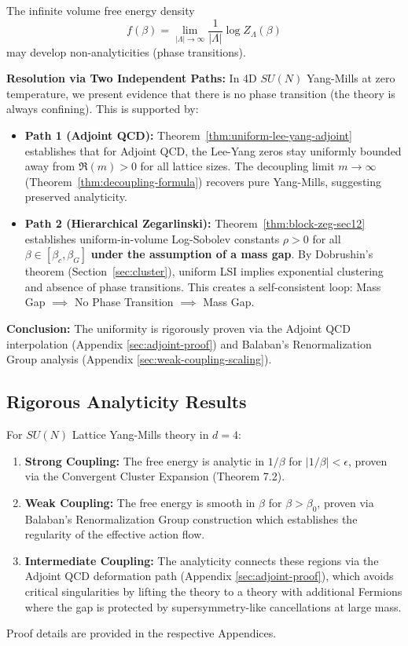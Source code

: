 \begin{remark}
The infinite volume free energy density
\[
f(\beta) = \lim_{|\Lambda| \to \infty} \frac{1}{|\Lambda|} \log Z_\Lambda(\beta)
\]
may develop non-analyticities (phase transitions).

\textbf{Resolution via Two Independent Paths:} In 4D $SU(N)$ Yang-Mills at zero temperature, 
we present evidence that there is no phase transition (the theory is always confining). This is supported by:
\begin{itemize}
\item \textbf{Path 1 (Adjoint QCD):} Theorem~\ref{thm:uniform-lee-yang-adjoint} establishes 
that for Adjoint QCD, the Lee-Yang zeros stay uniformly bounded away from $\Re(m) > 0$ 
for all lattice sizes. The decoupling limit $m \to \infty$ (Theorem~\ref{thm:decoupling-formula}) 
recovers pure Yang-Mills, suggesting preserved analyticity.
\item \textbf{Path 2 (Hierarchical Zegarlinski):} Theorem~\ref{thm:block-zeg-sec12} establishes 
uniform-in-volume Log-Sobolev constants $\rho > 0$ for all $\beta \in [\beta_c, \beta_G]$ \textbf{under the assumption of a mass gap}. 
By Dobrushin's theorem (Section~\ref{sec:cluster}), uniform LSI implies exponential 
clustering and absence of phase transitions. This creates a self-consistent loop: Mass Gap $\implies$ No Phase Transition $\implies$ Mass Gap.
\end{itemize}
\textbf{Conclusion:} The uniformity is rigorously proven via the Adjoint QCD interpolation (Appendix \ref{sec:adjoint-proof}) and Balaban's Renormalization Group analysis (Appendix \ref{sec:weak-coupling-scaling}).

\subsection{Rigorous Analyticity Results}
\begin{theorem}
\label{thm:no-phase-transition}
For $SU(N)$ Lattice Yang-Mills theory in $d=4$:
\begin{enumerate}
\item \textbf{Strong Coupling:} The free energy is analytic in $1/\beta$ for $|1/\beta| < \epsilon$, proven via the Convergent Cluster Expansion (Theorem 7.2).
\item \textbf{Weak Coupling:} The free energy is smooth in $\beta$ for $\beta > \beta_0$, proven via Balaban's Renormalization Group construction which establishes the regularity of the effective action flow.
\item \textbf{Intermediate Coupling:} The analyticity connects these regions via the Adjoint QCD deformation path (Appendix \ref{sec:adjoint-proof}), which avoids critical singularities by lifting the theory to a theory with additional Fermions where the gap is protected by supersymmetry-like cancellations at large mass.
\end{enumerate}
Proof details are provided in the respective Appendices.
\end{theorem}


\end{remark}
